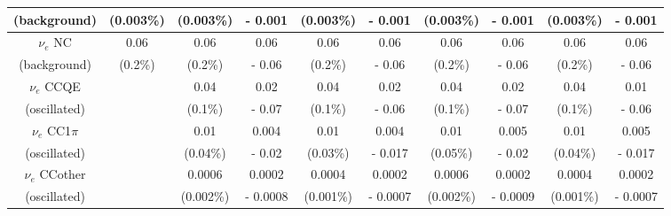 \begin{table}
\begin{tabular}{| c | c | c | c | c | c | c | c | c | c |}
(background) & (0.003\%) & (0.003\%) & - 0.001 & (0.003\%) & - 0.001 & (0.003\%) & - 0.001 & (0.003\%) & - 0.001 \\
\hline
$\nu_{e}$ NC & 0.06 & 0.06 & 0.06 & 0.06 & 0.06 & 0.06 & 0.06 & 0.06 & 0.06 \\
(background) & (0.2\%) & (0.2\%) & - 0.06  & (0.2\%) & - 0.06 & (0.2\%) & - 0.06 & (0.2\%) & - 0.06 \\
\hline
$\nu_{e}$ CCQE &  & 0.04 & 0.02 & 0.04 & 0.02  & 0.04 & 0.02 & 0.04 & 0.01 \\
(oscillated) &  & (0.1\%) & - 0.07 & (0.1\%) & - 0.06 & (0.1\%) & - 0.07 & (0.1\%) & - 0.06 \\
\hline
$\nu_{e}$ CC1$\pi$ &  & 0.01 & 0.004 & 0.01 & 0.004 & 0.01 & 0.005 & 0.01 & 0.005 \\
(oscillated) &  & (0.04\%) & - 0.02 & (0.03\%)  & - 0.017 & (0.05\%) & - 0.02 & (0.04\%) & - 0.017 \\
\hline
$\nu_{e}$ CCother &  & 0.0006 & 0.0002 & 0.0004 & 0.0002 & 0.0006 & 0.0002 & 0.0004 & 0.0002 \\
(oscillated) &  & (0.002\%) & - 0.0008 & (0.001\%) & - 0.0007 & (0.002\%) & - 0.0009 & (0.001\%) & - 0.0007 \\
\hline
\end{tabular}
\label{genieeventnumbers}
\end{table}

